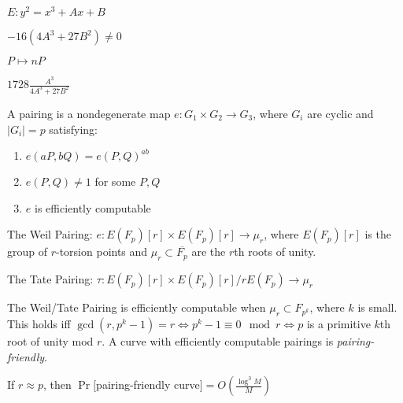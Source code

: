 \documentclass{article}
\newcommand\abs[1]{\left|#1\right|}
\begin{document}
$E: y^2 = x^3 + Ax + B$
\bigskip

$-16(4A^3+27B^2) \ne 0$

\bigskip

$P \mapsto n P$
\bigskip

$1728\frac{A^3}{4A^3+27B^2}$

\bigskip


\noindent A pairing is a nondegenerate map $e: G_1 \times G_2 \to G_3$, where $G_i$ are cyclic and $\abs{G_i} = p$ satisfying:
\begin{enumerate}
\item $e(aP, bQ) = e(P,Q)^{ab}$
\item $e(P,Q) \ne 1$ for some $P,Q$
\item $e$ is efficiently computable
\end{enumerate}

\bigskip

The Weil Pairing: $e: E(F_p)[r] \times E(F_p)[r] \to \mu_r$, where $E(F_p)[r]$ is the group of $r$-torsion points and $\mu_r \subset \overline{F_p}$ are the $r$th roots of unity.
\bigskip

The Tate Pairing: $\tau: E(F_p)[r] \times E(F_p)[r]/ rE(F_p) \to \mu_r$

\bigskip

The Weil/Tate Pairing is efficiently computable when $\mu_r \subset F_{p^k}$, where $k$ is small. This holds iff $\gcd(r,p^k-1) = r \iff p^k-1 \equiv 0 \mod r \iff p$ is a primitive $k$th root of unity mod $r$. A curve with efficiently computable pairings is {\it pairing-friendly}.

\bigskip

If $r \approx p$, then $\Pr[$pairing-friendly curve$] = O(\frac{\log^3 M}{M})$
\end{document}
